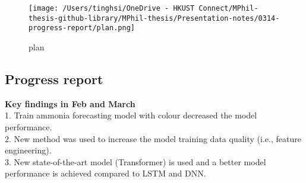 \documentclass[
]{article}
\begin{document}
\begin{figure}
\centering
\texttt{[image: /Users/tinghsi/OneDrive - HKUST Connect/MPhil-thesis-github-library/MPhil-thesis/Presentation-notes/0314-progress-report/plan.png]}
\caption{plan}
\end{figure}

\hypertarget{progress-report}{%
\subsection{Progress report}\label{progress-report}}

\textbf{Key findings in Feb and March}\\
1. Train ammonia forecasting model with colour decreased the model
performance.\\
2. New method was used to increase the model training data quality
(i.e., feature engineering).\\
3. New state-of-the-art model (Transformer) is used and a better model
performance is achieved compared to LSTM and DNN.
\end{document}
